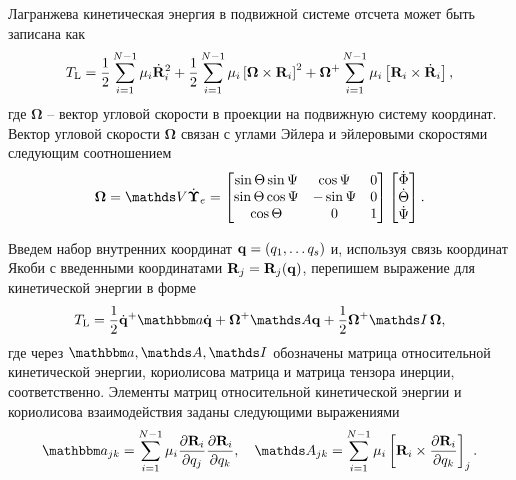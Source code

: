 Лагранжева кинетическая энергия в подвижной системе отсчета может быть записана как \cite{landau-volume1}
\begin{gather}
    T_\text{L} = \frac{1}{2} \sum_{i = 1}^{N-1} \mu_i \dot{\mathbf{R}}_i^2 + \frac{1}{2} \sum_{i = 1}^{N - 1} \mu_i \left[ \boldsymbol{\Omega} \times \mathbf{R}_i \right]^2 + \boldsymbol{\Omega}^{+} \sum_{i = 1}^{N - 1} \mu_i \left[ \mathbf{R}_i \times \dot{\mathbf{R}}_i \right],
\end{gather}
%
где $\boldsymbol{\Omega}$ -- вектор угловой скорости в проекции на подвижную систему координат. Вектор угловой скорости $\boldsymbol{\Omega}$ связан с углами Эйлера и эйлеровыми скоростями следующим соотношением
\begin{gather}
    \boldsymbol{\Omega} = \bbV \dot{\boldsymbol{\Upsilon}}_e = 
    \begin{bmatrix}
        \sin \Theta \sin \Psi & \cos \Psi & 0 \\
        \sin \Theta \cos \Psi & -\sin \Psi & 0 \\
        \cos \Theta & 0 & 1 
    \end{bmatrix}
    \begin{bmatrix}
        \dot{\Phi} \\ \dot{\Theta} \\ \dot{\Psi}
    \end{bmatrix}. \label{polyatom-matrixV}
\end{gather}

Введем набор внутренних координат $\mathbf{q} = \left( q_1, \dots q_s \right)$ и, используя связь координат Якоби с введенными координатами $\mathbf{R}_j = \mathbf{R}_j(\mathbf{q})$, перепишем выражение для кинетической энергии в форме \cite{petrov2015}
\begin{gather}
    \Tl = \frac{1}{2} \dot{\mf{q}}^+ \bba \dot{\mf{q}} + \bOmega^+ \bbA \mf{q} + \frac{1}{2} \bOmega^+ \bbI \, \bOmega, \label{body-fixed-lagrange-energy} 
\end{gather}
%
где через $\bba, \bbA, \bbI$ обозначены матрица относительной кинетической энергии, кориолисова матрица и матрица тензора инерции, соответственно. Элементы матриц относительной кинетической энергии и кориолисова взаимодействия заданы следующими выражениями
\begin{gather}
    \bba_{jk} = \sum_{i = 1}^{N - 1} \mu_i \frac{\partial \mf{R}_i}{\partial q_j} \frac{\partial \mf{R}_i}{\partial q_k}, \quad \bbA_{jk} = \sum_{i = 1}^{N - 1} \mu_i \lsq \mf{R}_i \times \frac{\partial \mf{R}_i}{\partial q_k} \rsq_j. \label{polyatom-kinetic-energy-matrices}
\end{gather}

